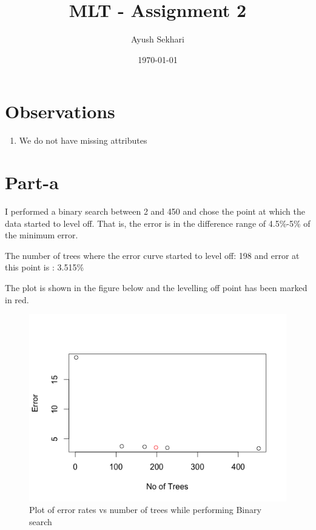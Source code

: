 \documentclass[12pt]{article}%
\begin{document}
\title{MLT - Assignment 2}
\author{Ayush Sekhari}
\date{\today}
\maketitle

\section{Observations}
\begin{enumerate}
\item We do not have missing attributes
\end{enumerate}

\section{Part-a}
I performed a binary search between 2 and 450 and chose the point at which the data started to level off. That is, the error is in the difference range of 4.5\%-5\% of the minimum error.  

The number of trees where the error curve started to level off:  198 and error at this point is : 3.515\%

The plot is shown in the figure below and the levelling off point has been marked in red.

\begin{figure}
\includegraphics{part.png}
\caption{Plot of error rates vs number of trees while performing Binary search}
\end{figure}
\end{document}
